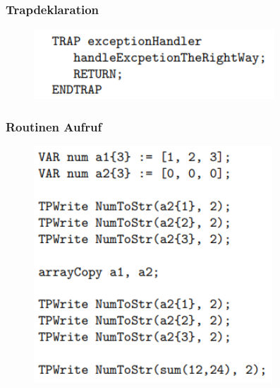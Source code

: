 \subsubsection{Trapdeklaration}
\begin{figure}[H]
	\begin{center}
		\includegraphics[scale=0.9]{resources/PNG/syntax6.PNG}
		\caption{}
		\label{fig:resources/PNG/syntax6.PNG}
	\end{center}
\end{figure}
\subsubsection{Routinen Aufruf}
\begin{figure}[H]
	\begin{center}
		\includegraphics[scale=0.9]{resources/PNG/syntax7.PNG}
		\caption{}
		\label{fig:resources/PNG/syntax7.PNG}
	\end{center}
\end{figure}
